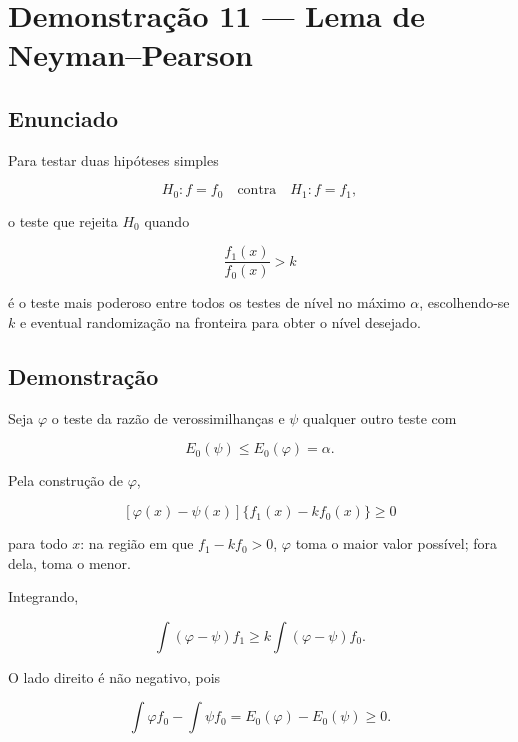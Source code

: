 \documentclass[
  letterpaper,
  DIV=11,
  numbers=noendperiod]{scrreprt}
\begin{document}

\section*{Demonstração 11 --- Lema de
Neyman--Pearson}\label{demonstrauxe7uxe3o-11-lema-de-neymanpearson}


\subsection*{Enunciado}\label{enunciado-16}

Para testar duas hipóteses simples

\[
H_0:f=f_0
\quad\text{contra}\quad
H_1:f=f_1,
\]

o teste que rejeita \(H_0\) quando

\[
\frac{f_1(x)}{f_0(x)}>k
\]

é o teste mais poderoso entre todos os testes de nível no máximo
\(\alpha\), escolhendo-se \(k\) e eventual randomização na fronteira
para obter o nível desejado.

\subsection*{Demonstração}\label{demonstrauxe7uxe3o-17}

Seja \(\varphi\) o teste da razão de verossimilhanças e \(\psi\)
qualquer outro teste com

\[
E_0(\psi)\leq E_0(\varphi)=\alpha.
\]

Pela construção de \(\varphi\),

\[
[\varphi(x)-\psi(x)]\{f_1(x)-kf_0(x)\}\geq 0
\]

para todo \(x\): na região em que \(f_1-kf_0>0\), \(\varphi\) toma o
maior valor possível; fora dela, toma o menor.

Integrando,

\[
\int(\varphi-\psi)f_1
\geq
k\int(\varphi-\psi)f_0.
\]

O lado direito é não negativo, pois

\[
\int\varphi f_0-
\int\psi f_0
=
E_0(\varphi)-E_0(\psi)
\geq 0.
\]
\end{document}
